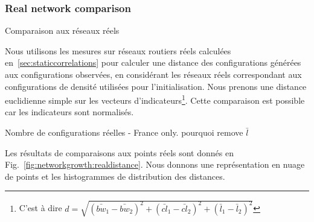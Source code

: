 \subsubsection{Real network comparison}{Comparaison aux réseaux réels}


Nous utilisons les mesures sur réseaux routiers réels calculées en~\ref{sec:staticcorrelations} pour calculer une distance des configurations générées aux configurations observées, en considérant les réseaux réels correspondant aux configurations de densité utilisées pour l'initialisation. Nous prenons une distance euclidienne simple sur les vecteurs d'indicateurs\footnote{C'est à dire $d = \sqrt{(\bar{bw}_1 - \bar{bw}_2)^2 + (\bar{cl}_1 - \bar{cl}_2)^2 + (\bar{l}_1 - \bar{l}_2)^2}$}. Cette comparaison est possible car les indicateurs sont normalisés.

Nombre de configurations réelles - France only.
pourquoi remove $\bar{l}$

Les résultats de comparaisons aux points réels sont donnés en Fig.~\ref{fig:networkgrowth:realdistance}. Nous donnons une représentation en nuage de points et les histogrammes de distribution des distances.



